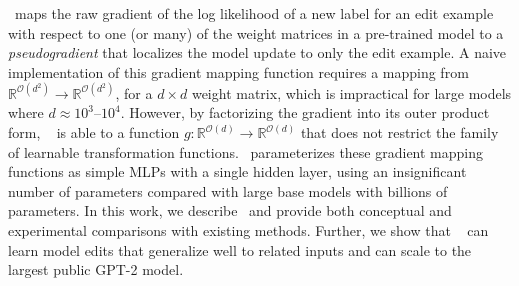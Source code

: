 \sname~maps the raw gradient of the log likelihood of a new label for an edit example with respect to one (or many) of the weight matrices in a pre-trained model to a \textit{pseudogradient} that localizes the model update to only the edit example. A naive implementation of this gradient mapping function requires a mapping from $\mathbb{R}^{\mathcal{O}(d^2)} \rightarrow \mathbb{R}^{\mathcal{O}(d^2)}$, for a $d \times d$ weight matrix, which is impractical for large models where $d\approx 10^3$--$10^4$. However, by factorizing the gradient into its outer product form, \sname~ is able to  a function $g:\mathbb{R}^{\mathcal{O}(d)} \rightarrow \mathbb{R}^{\mathcal{O}(d)}$ that does not restrict the family of learnable transformation functions. \sname~parameterizes these gradient mapping functions as simple MLPs with a single hidden layer, using an insignificant number of parameters compared with large base models with billions of parameters. In this work, we describe \name~and provide both conceptual and experimental comparisons with existing methods. Further, we show that \name~ can learn model edits that generalize well to related inputs and can scale to the largest public GPT-2 \citep{radford2019language} model.